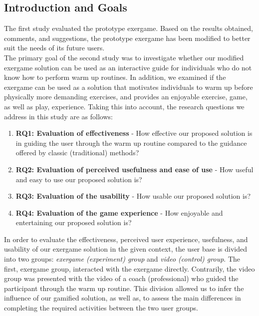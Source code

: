 \subsection{Introduction and Goals} \label{chapter:goals}
The first study evaluated the prototype exergame. Based on the results obtained, comments, and suggestions, the prototype exergame has been modified to better suit the needs of its future users.\\The primary goal of the second study was to investigate whether our modified exergame solution can be used as an interactive guide for individuals who do not know how to perform warm up routines. In addition, we examined if the exergame can be used as a solution that motivates individuals to warm up before physically more demanding exercises, and provides an enjoyable exercise, game, as well as play, experience. Taking this into account, the research questions we address in this study are as follows: 
\begin{enumerate}
\item \textbf{RQ1: Evaluation of effectiveness} - How effective our proposed solution is in guiding the user through the warm up routine compared to the guidance offered by classic (traditional) methods?
\item \textbf{RQ2: Evaluation of perceived usefulness and ease of use} - How useful and easy to use our proposed solution is?
\item \textbf{RQ3: Evaluation of the usability} - How usable our proposed solution is? 
\item \textbf{RQ4: Evaluation of the game experience} - How enjoyable and entertaining our proposed solution is? 
\end{enumerate}
In order to evaluate the effectiveness, perceived user experience, usefulness, and usability of our exergame solution in the given context, the user base is divided into two groups: \textit{exergame (experiment) group} and \textit{video (control) group}. The first, exergame group, interacted with the exergame directly. Contrarily, the video group was presented with the video of a coach (professional) who guided the participant through the warm up routine. This division allowed us to infer the influence of our gamified solution, as well as, to assess the main differences in completing the required activities between the two user groups. 
